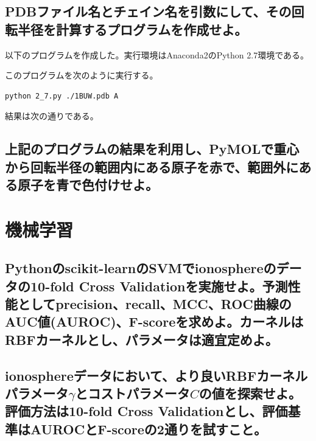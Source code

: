 \documentclass[uplatex,a4j]{jsarticle}
\begin{document}
  \subsection{PDBファイル名とチェイン名を引数にして、その回転半径を計算するプログラムを作成せよ。}
  以下のプログラムを作成した。実行環境はAnaconda2のPython 2.7環境である。
  
  このプログラムを次のように実行する。
  \begin{lstlisting}[caption=実行方法, label=run6]
    python 2_7.py ./1BUW.pdb A
  \end{lstlisting}
  結果は次の通りである。
  
  \subsection{上記のプログラムの結果を利用し、PyMOLで重心から回転半径の範囲内にある原子を赤で、範囲外にある原子を青で色付けせよ。}
  
  \section{機械学習}
  \subsection{Pythonのscikit-learnのSVMでionosphereのデータの10-fold Cross Validationを実施せよ。予測性能としてprecision、recall、MCC、ROC曲線のAUC値(AUROC)、F-scoreを求めよ。カーネルはRBFカーネルとし、パラメータは適宜定めよ。}
  
  \subsection{ionosphereデータにおいて、より良いRBFカーネルパラメータ$\gamma$とコストパラメータ$C$の値を探索せよ。評価方法は10-fold Cross Validationとし、評価基準はAUROCとF-scoreの2通りを試すこと。}
  
\end{document}
